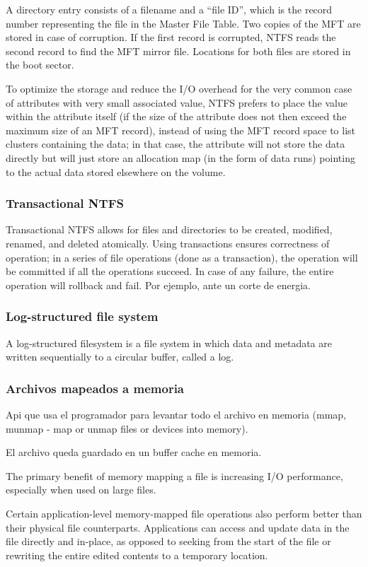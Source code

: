 \documentclass[a4paper, twoside]{article}
\begin{document}
A directory entry consists of a filename and a ``file ID'', which is the record number representing the file in the Master File Table. Two copies of the MFT are stored in case of corruption. If the first record is corrupted, NTFS reads the second record to find the MFT mirror file. Locations for both files are stored in the boot sector.

To optimize the storage and reduce the I/O overhead for the very common case of attributes with very small associated value, NTFS prefers to place the value within the attribute itself (if the size of the attribute does not then exceed the maximum size of an MFT record), instead of using the MFT record space to list clusters containing the data; in that case, the attribute will not store the data directly but will just store an allocation map (in the form of data runs) pointing to the actual data stored elsewhere on the volume.

\subsubsection{Transactional NTFS}
Transactional NTFS allows for files and directories to be created, modified, renamed, and deleted atomically. Using transactions ensures correctness of operation; in a series of file operations (done as a transaction), the operation will be committed if all the operations succeed. In case of any failure, the entire operation will rollback and fail. Por ejemplo, ante un corte de energia.

\subsubsection{Log-structured file system}
A log-structured filesystem is a file system in which data and metadata are written sequentially to a circular buffer, called a log.

\subsubsection{Archivos mapeados a memoria}
Api que usa el programador para levantar todo el archivo en memoria (mmap, munmap - map or unmap files or devices into memory).

El archivo queda guardado en un buffer cache en memoria.

The primary benefit of memory mapping a file is increasing I/O performance, especially when used on large files.

Certain application-level memory-mapped file operations also perform better than their physical file counterparts. Applications can access and update data in the file directly and in-place, as opposed to seeking from the start of the file or rewriting the entire edited contents to a temporary location.
\end{document}
